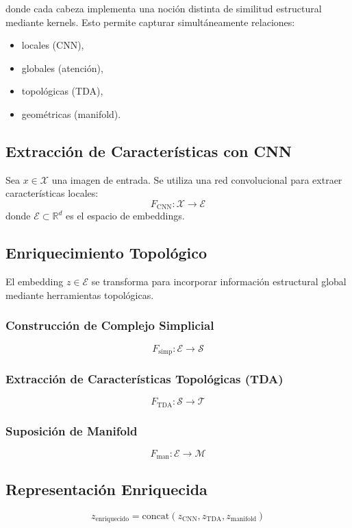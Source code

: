 \documentclass[conference]{IEEEtran}
\begin{document}
donde cada cabeza implementa una noción distinta de similitud estructural mediante kernels. Esto permite capturar simultáneamente relaciones:

\begin{itemize}
    \item locales (CNN),
    \item globales (atención),
    \item topológicas (TDA),
    \item geométricas (manifold).
\end{itemize}



\subsection{Extracción de Características con CNN}

Sea $x \in \mathcal{X}$ una imagen de entrada. Se utiliza una red convolucional para extraer características locales:
\[
F_{\text{CNN}}: \mathcal{X} \rightarrow \mathcal{E}
\]
donde $\mathcal{E} \subset \mathbb{R}^d$ es el espacio de embeddings.

\subsection{Enriquecimiento Topológico}

El embedding $z \in \mathcal{E}$ se transforma para incorporar información estructural global mediante herramientas topológicas.

\subsubsection{Construcción de Complejo Simplicial}
\[
F_{\text{simp}}: \mathcal{E} \rightarrow \mathcal{S}
\]

\subsubsection{Extracción de Características Topológicas (TDA)}
\[
F_{\text{TDA}}: \mathcal{S} \rightarrow \mathcal{T}
\]

\subsubsection{Suposición de Manifold}
\[
F_{\text{man}}: \mathcal{E} \rightarrow \mathcal{M}
\]

\subsection{Representación Enriquecida}
\[
z_{\text{enriquecido}} = \text{concat}(z_{\text{CNN}}, z_{\text{TDA}}, z_{\text{manifold}})
\]
\end{document}
